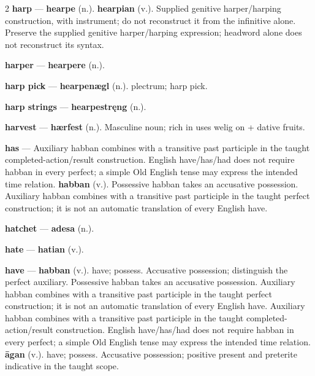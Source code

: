 \begin{multicols}{2}
\textbf{harp} — \textbf{hearpe} (n.).  \textbf{hearpian} (v.). Supplied genitive harper/harping construction, with instrument; do not reconstruct it from the infinitive alone. Preserve the supplied genitive harper/harping expression; headword alone does not reconstruct its syntax.\par
\textbf{harper} — \textbf{hearpere} (n.).\par
\textbf{harp pick} — \textbf{hearpenægl} (n.). plectrum; harp pick.\par
\textbf{harp strings} — \textbf{hearpestręng} (n.).\par
\textbf{harvest} — \textbf{hærfest} (n.). Masculine noun; rich in uses welig on + dative fruits.\par
\textbf{has} — Auxiliary habban combines with a transitive past participle in the taught completed-action/result construction. English have/has/had does not require habban in every perfect; a simple Old English tense may express the intended time relation. \textbf{habban} (v.). Possessive habban takes an accusative possession. Auxiliary habban combines with a transitive past participle in the taught perfect construction; it is not an automatic translation of every English have.\par
\textbf{hatchet} — \textbf{adesa} (n.).\par
\textbf{hate} — \textbf{hatian} (v.).\par
\textbf{have} — \textbf{habban} (v.). have; possess. Accusative possession; distinguish the perfect auxiliary. Possessive habban takes an accusative possession. Auxiliary habban combines with a transitive past participle in the taught perfect construction; it is not an automatic translation of every English have. Auxiliary habban combines with a transitive past participle in the taught completed-action/result construction. English have/has/had does not require habban in every perfect; a simple Old English tense may express the intended time relation. \textbf{āgan} (v.). have; possess. Accusative possession; positive present and preterite indicative in the taught scope.\par

\end{multicols}
